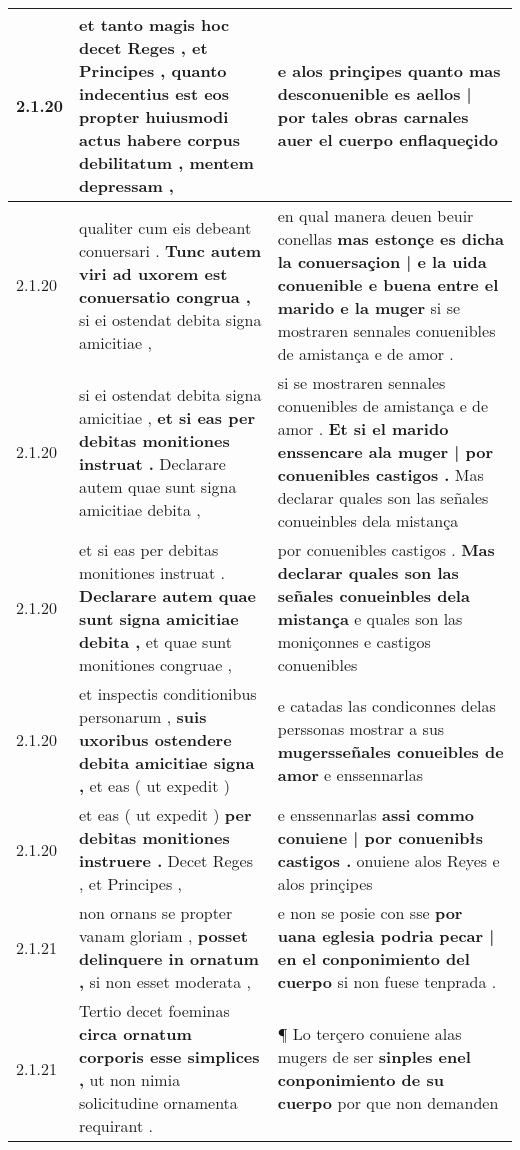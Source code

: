 \begin{tabular}{|p{1cm}|p{6.5cm}|p{6.5cm}|}
2.1.20 & et tanto magis hoc decet Reges , et Principes , \textbf{ quanto indecentius est eos propter huiusmodi actus habere corpus debilitatum , } mentem depressam , & e alos prinçipes \textbf{ quanto mas desconuenible es aellos | por tales obras carnales } auer el cuerpo enflaqueçido \\\hline
2.1.20 & qualiter cum eis debeant conuersari . \textbf{ Tunc autem viri ad uxorem est conuersatio congrua , } si ei ostendat debita signa amicitiae , & en qual manera deuen beuir conellas \textbf{ mas estonçe es dicha la conuersaçion | e la uida conuenible e buena entre el marido e la muger } si se mostraren sennales conuenibles de amistança e de amor . \\\hline
2.1.20 & si ei ostendat debita signa amicitiae , \textbf{ et si eas per debitas monitiones instruat . } Declarare autem quae sunt signa amicitiae debita , & si se mostraren sennales conuenibles de amistança e de amor . \textbf{ Et si el marido enssencare ala muger | por conuenibles castigos . } Mas declarar quales son las señales conueinbles dela mistança \\\hline
2.1.20 & et si eas per debitas monitiones instruat . \textbf{ Declarare autem quae sunt signa amicitiae debita , } et quae sunt monitiones congruae , & por conuenibles castigos . \textbf{ Mas declarar quales son las señales conueinbles dela mistança } e quales son las moniçonnes e castigos conuenibles \\\hline
2.1.20 & et inspectis conditionibus personarum , \textbf{ suis uxoribus ostendere debita amicitiae signa , } et eas ( ut expedit ) & e catadas las condiconnes delas perssonas mostrar a sus \textbf{ mugersseñales conueibles de amor } e enssennarlas \\\hline
2.1.20 & et eas ( ut expedit ) \textbf{ per debitas monitiones instruere . } Decet Reges , et Principes , & e enssennarlas \textbf{ assi commo conuiene | por conuenibłs castigos . } onuiene alos Reyes e alos prinçipes \\\hline
2.1.21 & non ornans se propter vanam gloriam , \textbf{ posset delinquere in ornatum , } si non esset moderata , & e non se posie con sse \textbf{ por uana eglesia podria pecar | en el conponimiento del cuerpo } si non fuese tenprada . \\\hline
2.1.21 & Tertio decet foeminas \textbf{ circa ornatum corporis esse simplices , } ut non nimia solicitudine ornamenta requirant . & ¶ Lo terçero conuiene alas mugers de ser \textbf{ sinples enel conponimiento de su cuerpo } por que non demanden \\\hline

\end{tabular}
